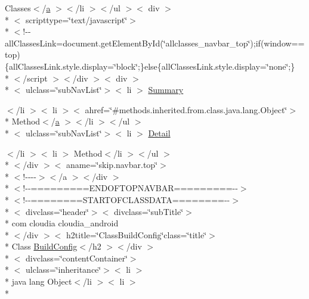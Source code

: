 \begin{DoxyCompactItemize}
\item 
Classes$<$/\hyperlink{style_8css_a5e8981582017bb8b84c21f148345d1f7}{a} $>$$<$/li $>$$<$/ul $>$$<$ div $>$\\*
$<$ scripttype=\char`\"{}text/javascript\char`\"{}$>$\\*
$<$!-\/-\/all\-Classes\-Link=document.\-get\-Element\-By\-Id(\char`\"{}allclasses\-\_\-navbar\-\_\-top\char`\"{});if(window==top)\{all\-Classes\-Link.\-style.\-display=\char`\"{}block\char`\"{};\}else\{all\-Classes\-Link.\-style.\-display=\char`\"{}none\char`\"{};\}\\*
$<$/script $>$$<$/div $>$$<$ div $>$\\*
$<$ ulclass=\char`\"{}sub\-Nav\-List\char`\"{}$>$$<$ li $>$ \hyperlink{_build_config_8html_a6f9ab45abc9b0679dc1b132fbacfc681}{Summary}
\item 
$<$/li $>$$<$ li $>$$<$ ahref=\char`\"{}\#methods.\-inherited.\-from.\-class.\-java.\-lang.\-Object\char`\"{}$>$\\*
 Method$<$/\hyperlink{style_8css_a5e8981582017bb8b84c21f148345d1f7}{a} $>$$<$/li $>$$<$/ul $>$\\*
$<$ ulclass=\char`\"{}sub\-Nav\-List\char`\"{}$>$$<$ li $>$ \hyperlink{_build_config_8html_aed0df2ae11502bf9389ac3cf53b1c0f6}{Detail}
\item 
$<$/li $>$$<$ li $>$ Method$<$/li $>$$<$/ul $>$\\*
$<$/div $>$$<$ aname=\char`\"{}skip.\-navbar.\-top\char`\"{}$>$\\*
$<$!-\/-\/-\/-\/$>$$<$/a $>$$<$/div $>$\\*
$<$!-\/-\/=========E\-N\-D\-O\-F\-T\-O\-P\-N\-A\-V\-B\-A\-R=========-\/-\/$>$\\*
$<$!-\/-\/========S\-T\-A\-R\-T\-O\-F\-C\-L\-A\-S\-S\-D\-A\-T\-A========-\/-\/$>$\\*
$<$ divclass=\char`\"{}header\char`\"{}$>$$<$ divclass=\char`\"{}sub\-Title\char`\"{}$>$\\*
 com cloudia cloudia\-\_\-android\\*
$<$/div $>$$<$ h2title=\char`\"{}Class\-Build\-Config\char`\"{}class=\char`\"{}title\char`\"{}$>$\\*
 Class \hyperlink{index-2_8html_a87160e58d7222284cdd67d42be178664}{Build\-Config}$<$/h2 $>$$<$/div $>$\\*
$<$ divclass=\char`\"{}content\-Container\char`\"{}$>$\\*
$<$ ulclass=\char`\"{}inheritance\char`\"{}$>$$<$ li $>$\\*
 java lang Object$<$/li $>$$<$ li $>$\\*
$$
\end{DoxyCompactItemize}
